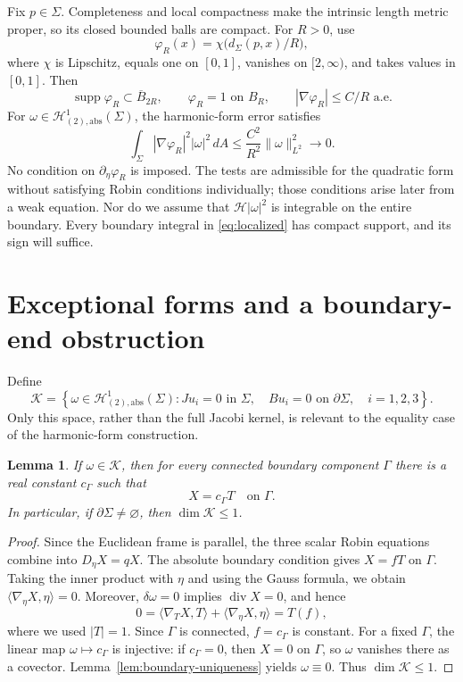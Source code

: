 \documentclass[11pt]{amsart}
\numberwithin{equation}{section}
\newtheorem{lemma}[theorem]{Lemma}
\theoremstyle{definition}
\theoremstyle{remark}
\newcommand{\HH}{\mathcal H}
\newcommand{\KK}{\mathcal K}
\newcommand{\dd}{\,d}
\DeclareMathOperator{\diver}{div}
\DeclareMathOperator{\supp}{supp}
\begin{document}
Fix $p\in\Sigma$. Completeness and local compactness make the intrinsic length metric proper, so its closed bounded balls are compact. For $R>0$, use
\[
\varphi_R(x)=\chi\bigl(d_\Sigma(p,x)/R\bigr),
\]
where $\chi$ is Lipschitz, equals one on $[0,1]$, vanishes on $[2,\infty)$, and takes values in $[0,1]$. Then
\begin{equation}\label{eq:cutoffs}
\supp\varphi_R\subset\overline B_{2R},\qquad
\varphi_R=1\text{ on }B_R,\qquad
|\nabla\varphi_R|\le C/R\text{ a.e.}
\end{equation}
For $\omega\in\HH^1_{(2),\mathrm{abs}}(\Sigma)$, the harmonic-form error satisfies
\begin{equation}\label{eq:cutoff-error}
\int_\Sigma|\nabla\varphi_R|^2|\omega|^2\dd A
\le\frac{C^2}{R^2}\|\omega\|_{L^2}^2\longrightarrow0.
\end{equation}
No condition on $\partial_\eta\varphi_R$ is imposed. The tests are admissible for the quadratic form without satisfying Robin conditions individually; those conditions arise later from a weak equation. Nor do we assume that $\mathscr H|\omega|^2$ is integrable on the entire boundary. Every boundary integral in \eqref{eq:localized} has compact support, and its sign will suffice.

\section{Exceptional forms and a boundary-end obstruction}\label{sec:exceptional}
Define
\begin{equation}\label{eq:exceptional-space}
\KK=\left\{\omega\in\HH^1_{(2),\mathrm{abs}}(\Sigma):
Ju_i=0\text{ in }\Sigma,\quad Bu_i=0\text{ on }\partial\Sigma,
\quad i=1,2,3\right\}.
\end{equation}
Only this space, rather than the full Jacobi kernel, is relevant to the equality case of the harmonic-form construction.

\begin{lemma}\label{lem:constant}
If $\omega\in\KK$, then for every connected boundary component $\Gamma$ there is a real constant $c_\Gamma$ such that
\begin{equation}\label{eq:constant-component}
X=c_\Gamma T\quad\text{on }\Gamma.
\end{equation}
In particular, if $\partial\Sigma\ne\varnothing$, then $\dim\KK\le1$.
\end{lemma}
\begin{proof}
Since the Euclidean frame is parallel, the three scalar Robin equations
combine into
\(
D_\eta X=qX.
\)
The absolute boundary condition gives $X=fT$ on $\Gamma$. Taking the
inner product with $\eta$ and using the Gauss formula, we obtain
$\langle\nabla_\eta X,\eta\rangle=0$. Moreover, $\delta\omega=0$
implies $\diver X=0$, and hence
\[
0=\langle\nabla_TX,T\rangle+\langle\nabla_\eta X,\eta\rangle
=T(f),
\]
where we used $|T|=1$. Since $\Gamma$ is connected, $f=c_\Gamma$
is constant. For a fixed $\Gamma$, the linear map
$\omega\mapsto c_\Gamma$ is injective: if $c_\Gamma=0$, then
$X=0$ on $\Gamma$, so $\omega$ vanishes there as a covector.
Lemma~\ref{lem:boundary-uniqueness} yields $\omega\equiv0$.
Thus $\dim\mathcal K\le1$.
\end{proof}
\end{document}
